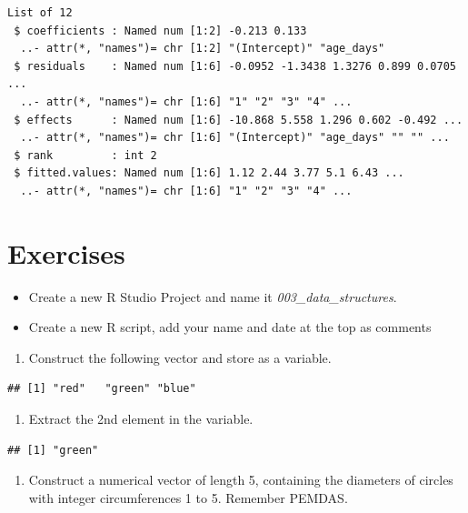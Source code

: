 \documentclass[
]{book}
\providecommand{\tightlist}{%
  \setlength{\itemsep}{0pt}\setlength{\parskip}{0pt}}
\begin{document}
\begin{verbatim}
List of 12
 $ coefficients : Named num [1:2] -0.213 0.133
  ..- attr(*, "names")= chr [1:2] "(Intercept)" "age_days"
 $ residuals    : Named num [1:6] -0.0952 -1.3438 1.3276 0.899 0.0705 ...
  ..- attr(*, "names")= chr [1:6] "1" "2" "3" "4" ...
 $ effects      : Named num [1:6] -10.868 5.558 1.296 0.602 -0.492 ...
  ..- attr(*, "names")= chr [1:6] "(Intercept)" "age_days" "" "" ...
 $ rank         : int 2
 $ fitted.values: Named num [1:6] 1.12 2.44 3.77 5.1 6.43 ...
  ..- attr(*, "names")= chr [1:6] "1" "2" "3" "4" ...
\end{verbatim}

\hypertarget{exercises-2}{%
\section*{Exercises}\label{exercises-2}}

\begin{itemize}
\tightlist
\item
  Create a new R Studio Project and name it \emph{003\_data\_structures}.
\item
  Create a new R script, add your name and date at the top as comments
\end{itemize}

\begin{enumerate}
\def\labelenumi{\arabic{enumi}.}
\tightlist
\item
  Construct the following vector and store as a variable.
\end{enumerate}

\begin{verbatim}
## [1] "red"   "green" "blue"
\end{verbatim}

\begin{enumerate}
\def\labelenumi{\arabic{enumi}.}
\setcounter{enumi}{1}
\tightlist
\item
  Extract the 2nd element in the variable.
\end{enumerate}

\begin{verbatim}
## [1] "green"
\end{verbatim}

\begin{enumerate}
\def\labelenumi{\arabic{enumi}.}
\setcounter{enumi}{2}
\tightlist
\item
  Construct a numerical vector of length 5, containing the diameters of circles with integer circumferences 1 to 5. Remember PEMDAS.
\end{enumerate}
\end{document}
